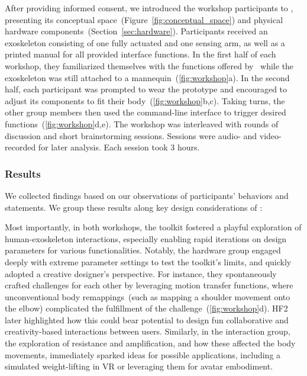 After providing informed consent, we introduced the workshop participants to \toolkit, presenting its conceptual space~(Figure~\ref{fig:conceptual_space}) and physical hardware components~(Section~\ref{sec:hardware}). 
Participants received an exoskeleton consisting of one fully actuated and one sensing arm, as well as a printed manual for all provided interface functions. 
In the first half of each workshop, they familiarized themselves with the functions offered by \toolkit~while the exoskeleton was still attached to a mannequin~(\autoref{fig:workshop}a). 
In the second half, each participant was prompted to wear the prototype and encouraged to adjust its components to fit their body~(\autoref{fig:workshop}b,c). Taking turns, the other group members then used the command-line interface to trigger desired functions~(\autoref{fig:workshop}d,e). 
The workshop was interleaved with rounds of discussion and short brainstorming sessions. 
Sessions were audio- and video-recorded for later analysis. Each session took 3 hours. 



\subsubsection{Results}
We collected findings based on our observations of participants' behaviors and statements. We group these results along key design considerations of \toolkit:


Most importantly, in both workshops, the toolkit fostered a playful exploration of human-exoskeleton interactions, especially enabling rapid iterations on design parameters for various functionalities. Notably, the hardware group engaged deeply with extreme parameter settings to test the toolkit's limits, and quickly adopted a creative designer's perspective. For instance, they spontaneously crafted challenges for each other by leveraging motion transfer functions, where unconventional body remappings~(such as mapping a shoulder movement onto the elbow) complicated the fulfillment of the challenge~(\autoref{fig:workshop}d). HF2 later highlighted how this could bear potential to design fun collaborative and creativity-based interactions between users.
Similarly, in the interaction group, the exploration of resistance and amplification, and how these affected the body movements, immediately sparked ideas for possible applications, including a simulated weight-lifting in VR or leveraging them for avatar embodiment. 

